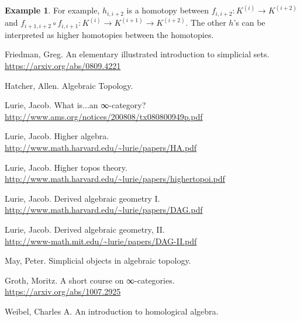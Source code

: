 \documentclass[a4paper]{amsart}
\numberwithin{figure}{section}
\theoremstyle{theorem}
\theoremstyle{definition}
\newtheorem{exam}[thm]{Example}
\begin{document}
\begin{exam}
For example, $h_{i,i{+}2}$ is a homotopy between $f_{i,i{+}2}: K^{(i)} \to K^{(i{+}2)}$ and $f_{i{+}1,i{+}2} \circ f_{i,i{+}1}: K^{(i)} \to K^{(i{+}1)} \to K^{(i{+}2)}$. The other $h$'s can be interpreted as higher homotopies between the homotopies.
%
\end{exam}



\begin{thebibliography}{99.}

Friedman, Greg.
\newblock An elementary illustrated introduction to simplicial sets.\\
\newblock \url{https://arxiv.org/abs/0809.4221}

Hatcher, Allen.
\newblock Algebraic Topology.

Lurie, Jacob.
\newblock What is...an ∞-category? \\
\newblock \url{http://www.ams.org/notices/200808/tx080800949p.pdf}

Lurie, Jacob.
\newblock Higher algebra. \\
\newblock \url{http://www.math.harvard.edu/~lurie/papers/HA.pdf}

Lurie, Jacob.
\newblock Higher topos theory. \\
\newblock \url{http://www.math.harvard.edu/~lurie/papers/highertopoi.pdf}

Lurie, Jacob.
\newblock Derived algebraic geometry I. \\
\newblock \url{http://www.math.harvard.edu/~lurie/papers/DAG.pdf}

Lurie, Jacob.
\newblock Derived algebraic geometry, II. \\
\newblock \url{http://www-math.mit.edu/~lurie/papers/DAG-II.pdf} 

May, Peter.
\newblock Simplicial objects in algebraic topology.

Groth, Moritz.
\newblock A short course on ∞-categories. \\
\newblock \url{https://arxiv.org/abs/1007.2925}

Weibel, Charles  A.
\newblock An introduction to homological algebra.
\end{thebibliography}
\end{document}
